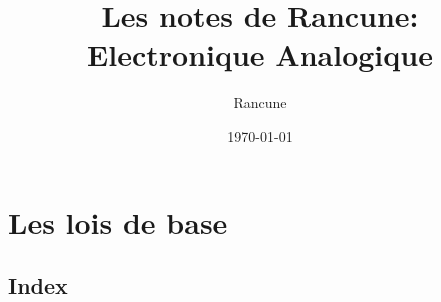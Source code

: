 \documentclass[a4paper,12pt]{book}
\title{Les notes de Rancune: \\Electronique Analogique}
\author{Rancune}
\date{\today}
\begin{document}
\maketitle

\frontmatter

\tableofcontents    

%

\mainmatter

\part{ Les lois de base }


%
%
%
%


%
%
%


%
%
%




\backmatter

\chapter*{Index}
\printindex

\end{document}
